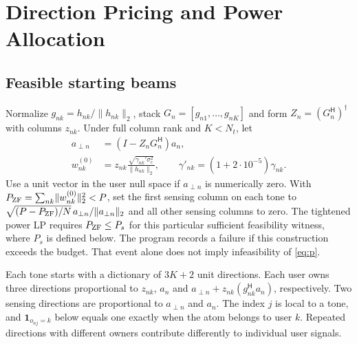 \documentclass[journal]{IEEEtran}
\newcommand{\Hh}{^{\mathsf H}}
\newcommand{\norm}[1]{\lVert #1\rVert}
\begin{document}
\section{Direction Pricing and Power Allocation}
\subsection{Feasible starting beams}
Normalize $g_{nk}=h_{nk}/\norm{h_{nk}}_2$, stack $G_n=[g_{n1},\ldots,g_{nK}]$ and form $Z_n=(G_n\Hh)^\dagger$ with columns $z_{nk}$. Under full column rank and $K<N_t$, let
\begin{align}
 a_{\perp n}&=(I-Z_nG_n\Hh)a_n,\\
 w_{nk}^{(0)}&=z_{nk}\frac{\sqrt{\gamma_{nk}'\sigma_c^2}}{\norm{h_{nk}}_2},
 \qquad \gamma'_{nk}=(1+2\cdot10^{-5})\gamma_{nk}.
\end{align}
Use a unit vector in the user null space if $a_{\perp n}$ is numerically zero. With $P_{\rm ZF}=\sum_{nk}\norm{w_{nk}^{(0)}}_2^2<P$, set the first sensing column on each tone to $\sqrt{(P-P_{\rm ZF})/N}\,a_{\perp n}/\norm{a_{\perp n}}_2$ and all other sensing columns to zero. The tightened power LP requires $P_{\rm ZF}\le P_s$ for this particular sufficient feasibility witness, where $P_s$ is defined below. The program records a failure if this construction exceeds the budget. That event alone does not imply infeasibility of \eqref{eq:p}.

Each tone starts with a dictionary of $3K+2$ unit directions. Each user owns three directions proportional to $z_{nk}$, $a_n$ and $a_{\perp n}+z_{nk}(g_{nk}\Hh a_n)$, respectively. Two sensing directions are proportional to $a_{\perp n}$ and $a_n$. The index $j$ is local to a tone, and $\mathbf1_{o_{nj}=k}$ below equals one exactly when the atom belongs to user $k$. Repeated directions with different owners contribute differently to individual user signals.
\end{document}
